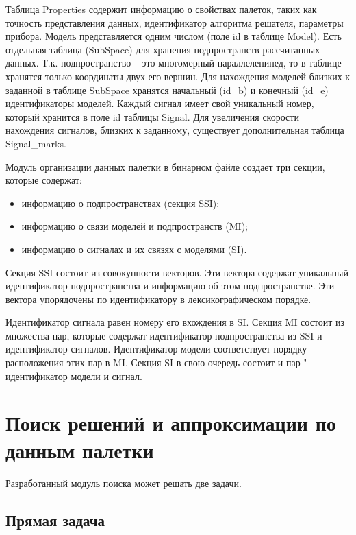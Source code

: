 Таблица Properties содержит информацию о свойствах палеток, таких как
точность представления данных, идентификатор алгоритма решателя, параметры
прибора.  Модель представляется одним числом (поле id в таблице Model).
Есть отдельная таблица (SubSpace) для хранения подпространств рассчитанных
данных. Т.к. подпространство – это многомерный параллелепипед, то в таблице
хранятся только координаты двух его вершин. Для нахождения моделей близких
к заданной в таблице SubSpace хранятся начальный (id\_b) и конечный (id\_e)
идентификаторы моделей. Каждый сигнал имеет свой уникальный номер, который
хранится в поле id таблицы Signal. Для увеличения скорости нахождения
сигналов, близких к заданному, существует дополнительная таблица
Signal\_marks.

Модуль организации данных палетки в бинарном файле создает три секции,
которые содержат:
\begin{itemize}
\item информацию о подпространствах (секция SSI);
\item информацию о связи моделей и подпространств (MI);
\item информацию о сигналах и их связях с моделями (SI).
\end{itemize}

Секция SSI состоит из совокупности векторов. Эти вектора содержат
уникальный идентификатор подпространства и информацию об этом
подпространстве. Эти вектора упорядочены по идентификатору в
лексикографическом порядке.

Идентификатор сигнала равен номеру его вхождения в SI. Секция MI состоит из
множества пар, которые содержат идентификатор подпространства из SSI и
идентификатор сигналов. Идентификатор модели соответствует порядку
расположения этих пар в MI. Секция SI в свою очередь состоит и пар "--- 
идентификатор модели и сигнал.

\section{Поиск решений и аппроксимации по данным палетки} \label{sect2_5}

Разработанный модуль поиска может решать две задачи.

\subsection{Прямая задача}


